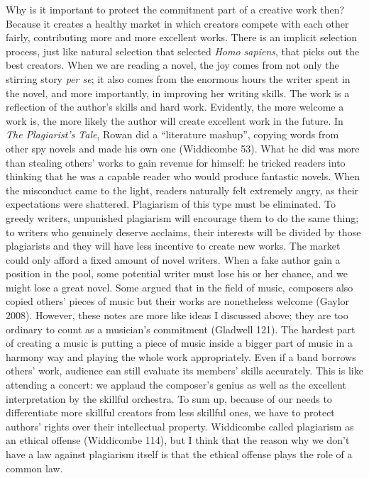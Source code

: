 \documentclass{writing}
\begin{document}
Why is it important to protect the commitment part of a creative work
then? Because it creates a healthy market in which creators compete with
each other fairly, contributing more and more excellent works. There is
an implicit selection process, just like natural selection that selected
\emph{Homo sapiens}, that picks out the best creators. When we are
reading a novel, the joy comes from not only the stirring story
\emph{per se}; it also comes from the enormous hours the writer spent in
the novel, and more importantly, in improving her writing skills. The
work is a reflection of the author's skills and hard work. Evidently,
the more welcome a work is, the more likely the author will create
excellent work in the future. In \emph{The Plagiarist's Tale}, Rowan did
a ``literature mashup'', copying words from other spy novels and made
his own one (Widdicombe 53). What he did was more than stealing others'
works to gain revenue for himself: he tricked readers into thinking that
he was a capable reader who would produce fantastic novels. When the
misconduct came to the light, readers naturally felt extremely angry, as
their expectations were shattered. Plagiarism of this type must be
eliminated. To greedy writers, unpunished plagiarism will encourage them
to do the same thing; to writers who genuinely deserve acclaims, their
interests will be divided by those plagiarists and they will have less
incentive to create new works. The market could only afford a fixed
amount of novel writers. When a fake author gain a position in the pool,
some potential writer must lose his or her chance, and we might lose a
great novel. Some argued that in the field of music, composers also
copied others' pieces of music but their works are nonetheless welcome
(Gaylor 2008). However, these notes are more like ideas I discussed
above; they are too ordinary to count as a musician's commitment
(Gladwell 121). The hardest part of creating a music is putting a piece
of music inside a bigger part of music in a harmony way and playing the
whole work appropriately. Even if a band borrows others' work, audience
can still evaluate its members' skills accurately. This is like
attending a concert: we applaud the composer's genius as well as the
excellent interpretation by the skillful orchestra. To sum up, because
of our needs to differentiate more skillful creators from less skillful
ones, we have to protect authors' rights over their intellectual
property. Widdicombe called plagiarism as an ethical offense (Widdicombe
114), but I think that the reason why we don't have a law against
plagiarism itself is that the ethical offense plays the role of a common
law.
\end{document}
